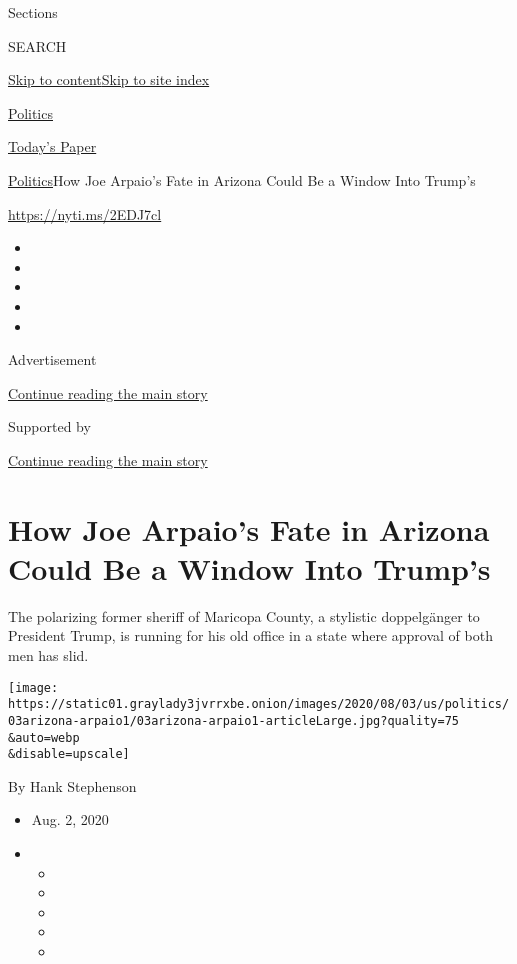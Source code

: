 Sections

SEARCH

\protect\hyperlink{site-content}{Skip to
content}\protect\hyperlink{site-index}{Skip to site index}

\href{https://www.nytimes3xbfgragh.onion/section/politics}{Politics}

\href{https://myaccount.nytimes3xbfgragh.onion/auth/login?response_type=cookie\&client_id=vi}{}

\href{https://www.nytimes3xbfgragh.onion/section/todayspaper}{Today's
Paper}

\href{/section/politics}{Politics}\textbar{}How Joe Arpaio's Fate in
Arizona Could Be a Window Into Trump's

\href{https://nyti.ms/2EDJ7cl}{https://nyti.ms/2EDJ7cl}

\begin{itemize}
\item
\item
\item
\item
\item
\end{itemize}

Advertisement

\protect\hyperlink{after-top}{Continue reading the main story}

Supported by

\protect\hyperlink{after-sponsor}{Continue reading the main story}

\hypertarget{how-joe-arpaios-fate-in-arizona-could-be-a-window-into-trumps}{%
\section{How Joe Arpaio's Fate in Arizona Could Be a Window Into
Trump's}\label{how-joe-arpaios-fate-in-arizona-could-be-a-window-into-trumps}}

The polarizing former sheriff of Maricopa County, a stylistic
doppelgänger to President Trump, is running for his old office in a
state where approval of both men has slid.

\texttt{[image: https://static01.graylady3jvrrxbe.onion/images/2020/08/03/us/politics/03arizona-arpaio1/03arizona-arpaio1-articleLarge.jpg?quality=75\\\&auto=webp\\\&disable=upscale]}

By Hank Stephenson

\begin{itemize}
\item
  Aug. 2, 2020
\item
  \begin{itemize}
  \item
  \item
  \item
  \item
  \item
  \end{itemize}
\end{itemize}

